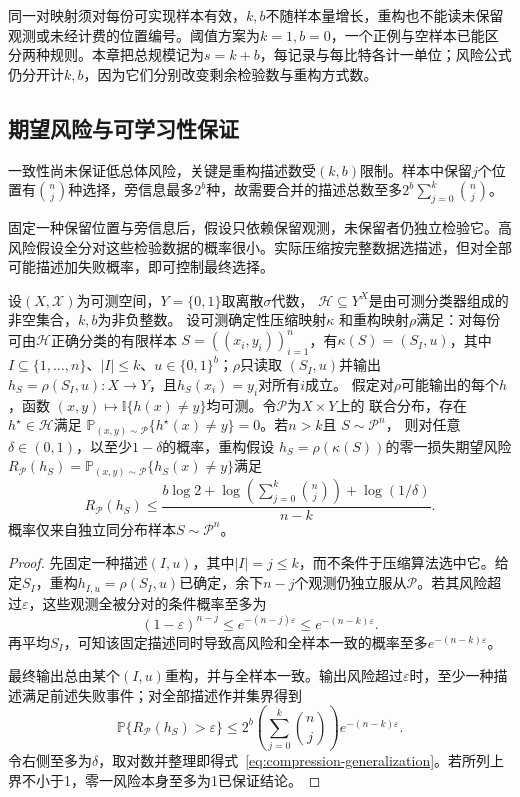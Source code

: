 同一对映射须对每份可实现样本有效，$k,b$不随样本量增长，重构也不能读未保留观测或未经计费的位置编号。阈值方案为$k=1,b=0$，一个正例与空样本已能区分两种规则。本章把总规模记为$s=k+b$，每记录与每比特各计一单位；风险公式仍分开计$k,b$，因为它们分别改变剩余检验数与重构方式数。

\subsection{期望风险与可学习性保证}

一致性尚未保证低总体风险，关键是重构描述数受$(k,b)$限制。样本中保留$j$个位置有$\binom nj$种选择，旁信息最多$2^b$种，故需要合并的描述总数至多$2^b\sum_{j=0}^k\binom nj$。

固定一种保留位置与旁信息后，假设只依赖保留观测，未保留者仍独立检验它。高风险假设全分对这些检验数据的概率很小。实际压缩按完整数据选描述，但对全部可能描述加失败概率，即可控制最终选择。

\begin{theorem}[一致样本压缩的期望风险上界]
\label{thm:sample-compression-bound}
设$(X,\mathcal X)$为可测空间，$Y=\{0,1\}$取离散$\sigma$代数，
$\mathcal H\subseteq Y^X$是由可测分类器组成的非空集合，$k,b$为非负整数。
设可测确定性压缩映射$\kappa$
和重构映射$\rho$满足：对每份可由$\mathcal H$正确分类的有限样本
$S=((x_i,y_i))_{i=1}^n$，有$\kappa(S)=(S_I,u)$，其中
$I\subseteq\{1,\ldots,n\}$、$|I|\leq k$、$u\in\{0,1\}^b$；$\rho$只读取
$(S_I,u)$并输出$h_S=\rho(S_I,u):X\to Y$，且$h_S(x_i)=y_i$对所有$i$成立。
假定对$\rho$可能输出的每个$h$，函数
$(x,y)\mapsto\mathbb I\{h(x)\neq y\}$均可测。令$\mathcal P$为$X\times Y$上的
联合分布，存在$h^\star\in\mathcal H$满足
$\mathbb P_{(x,y)\sim\mathcal P}\{h^\star(x)\neq y\}=0$。若$n>k$且
$S\sim\mathcal P^n$，
则对任意$\delta\in(0,1)$，以至少$1-\delta$的概率，重构假设
$h_S=\rho(\kappa(S))$的零一损失期望风险
$R_{\mathcal P}(h_S)=\mathbb P_{(x,y)\sim\mathcal P}\{h_S(x)\neq y\}$满足
\begin{equation}
 R_{\mathcal P}(h_S)
 \leq\frac{b\log2+\log\!\left(\sum_{j=0}^k\binom nj\right)+\log(1/\delta)}{n-k}.
 \label{eq:compression-generalization}
\end{equation}
概率仅来自独立同分布样本$S\sim\mathcal P^n$。
\end{theorem}

\begin{proof}
先固定一种描述$(I,u)$，其中$|I|=j\leq k$，而不条件于压缩算法选中它。给定$S_I$，重构$h_{I,u}=\rho(S_I,u)$已确定，余下$n-j$个观测仍独立服从$\mathcal P$。若其风险超过$\varepsilon$，这些观测全被分对的条件概率至多为
\[
 (1-\varepsilon)^{n-j}\leq e^{-(n-j)\varepsilon}
 \leq e^{-(n-k)\varepsilon}.
\]
再平均$S_I$，可知该固定描述同时导致高风险和全样本一致的概率至多$e^{-(n-k)\varepsilon}$。

最终输出总由某个$(I,u)$重构，并与全样本一致。输出风险超过$\varepsilon$时，至少一种描述满足前述失败事件；对全部描述作并集界得到
\[
 \mathbb P\{R_{\mathcal P}(h_S)>\varepsilon\}
 \leq 2^b\left(\sum_{j=0}^k\binom nj\right)e^{-(n-k)\varepsilon}.
\]
令右侧至多为$\delta$，取对数并整理即得式~\eqref{eq:compression-generalization}。若所列上界不小于1，零一风险本身至多为1已保证结论。
\end{proof}

